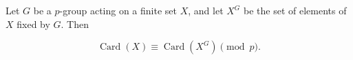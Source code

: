 Let $G$ be a $p$-group acting on a finite set $X$, and let $X^G$ be the set of elements of $X$ fixed by $G$. Then

$$\operatorname{Card}(X) \equiv \operatorname{Card}(X^G) \pmod{p}.$$
